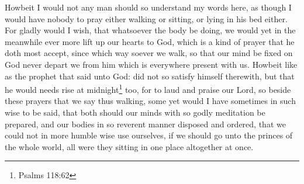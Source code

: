 \documentclass[a5paper]{scrbook}
\begin{document}
	Howbeit I would not any man should so understand my words here, as though I would have nobody to pray either walking or sitting, or lying in his bed either. For gladly would I wish, that whatsoever the body be doing, we would yet in the meanwhile ever more lift up our hearts to God, which is a kind of prayer that he doth most accept, since which way soever we walk, so that our mind be fixed on God never depart we from him which is everywhere present with us. Howbeit like as the prophet that said unto God:  did not so satisfy himself therewith, but that he would needs rise at midnight\footnote{Psalms 118:62} too, for to laud and praise our Lord, so beside these prayers that we say thus walking, some yet would I have sometimes in such wise to be said, that both should our minds with so godly meditation be prepared, and our bodies in so reverent manner disposed and ordered, that we could not in more humble wise use ourselves, if we should go unto the princes of the whole world, all were they sitting in one place altogether at once.
	
\end{document}
